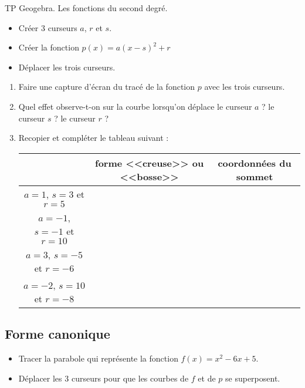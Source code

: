 {\begin{activity}{TP Geogebra. Les fonctions du second degré.}
\begin{itemize}
\item Créer 3 curseurs $a$, $r$ et $s$.

\item Créer la fonction $p(x)=a(x-s)^2+r$

\item Déplacer les trois curseurs.

\end{itemize}

\begin{enumerate}
[resume]

\item Faire une capture d'écran du tracé de la fonction $p$ avec les trois curseurs.

\item Quel effet observe-t-on sur la courbe lorsqu'on déplace le curseur $a$ ? le curseur $s$ ? le curseur $r$ ? 



\item Recopier et compléter le tableau suivant :


\begin{tabular}{|c|c|c|} \hline 
& forme <<creuse>> ou <<bosse>> & coordonnées du sommet \\ \hline 
$a=1$, $s=3$ et  $r=5$ & & \\ \hline 
$a=-1$, $s=-1$ et  $r=10$ & & \\ \hline 
$a=3$, $s=-5$ et  $r=-6$ & & \\ \hline 
$a=-2$, $s=10$ et  $r=-8$ & & \\ \hline 
\end{tabular}

\end{enumerate}


\bigskip

\subsection*{Forme canonique}

\begin{itemize}

\item  Tracer la parabole qui représente la fonction  $f(x)=x^2-6x+5$.

\item Déplacer les 3 curseurs pour que les courbes de $f$ et de $p$ se superposent. 

\end{itemize}




\end{activity}}

